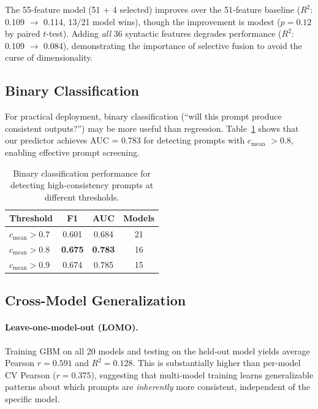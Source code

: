 \documentclass{article}
\newcommand{\cmean}{$c_\text{mean}$}
\begin{document}
The 55-feature model (51 + 4 selected) improves over the 51-feature baseline ($R^2$: 0.109 $\to$ 0.114, 13/21 model wins), though the improvement is modest ($p = 0.12$ by paired $t$-test). Adding \emph{all} 36 syntactic features degrades performance ($R^2$: 0.109 $\to$ 0.084), demonstrating the importance of selective fusion to avoid the curse of dimensionality.


\subsection{Binary Classification}
\label{sec:binary}

For practical deployment, binary classification (``will this prompt produce consistent outputs?'') may be more useful than regression. Table~\ref{tab:binary} shows that our predictor achieves AUC = 0.783 for detecting prompts with \cmean{} $> 0.8$, enabling effective prompt screening.

\begin{table}[t]
\centering
\caption{Binary classification performance for detecting high-consistency prompts at different thresholds.}
\label{tab:binary}
\small
\begin{tabular}{@{}lccc@{}}
\toprule
Threshold & F1 & AUC & Models \\
\midrule
$c_\text{mean} > 0.7$ & 0.601 & 0.684 & 21 \\
$c_\text{mean} > 0.8$ & \textbf{0.675} & \textbf{0.783} & 16 \\
$c_\text{mean} > 0.9$ & 0.674 & 0.785 & 15 \\
\bottomrule
\end{tabular}
\end{table}


\subsection{Cross-Model Generalization}
\label{sec:generalization}

\paragraph{Leave-one-model-out (LOMO).}
Training GBM on all 20 models and testing on the held-out model yields average Pearson $r = 0.591$ and $R^2 = 0.128$. This is substantially higher than per-model CV Pearson ($r = 0.375$), suggesting that multi-model training learns generalizable patterns about which prompts are \emph{inherently} more consistent, independent of the specific model.
\end{document}
